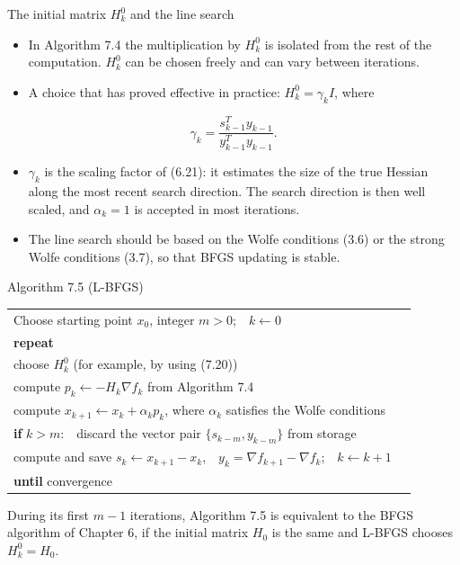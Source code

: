 \documentclass[aspectratio=169,12pt]{beamer}
\makeatletter
\newcommand{\gradf}{\nabla f}
\newcommand{\la}{\leftarrow}
\newcommand{\algostretch}{1.12}
\newenvironment{algo}{\par\renewcommand{\arraystretch}{\algostretch}%
  \begin{tabular}{@{}l@{\hspace{2.2em}}l@{}}}{\end{tabular}\par}
\makeatother
\begin{document}
\begin{frame}{The initial matrix $H_{k}^{0}$ and the line search}
  \begin{itemize}\setlength\itemsep{0.5em}
    \item In Algorithm 7.4 the multiplication by $H_{k}^{0}$ is isolated from the rest of the
      computation. $H_{k}^{0}$ can be chosen freely and can vary between iterations.
    \item A choice that has proved effective in practice: $H_{k}^{0}=\gamma_{k}I$, where
  \end{itemize}
  \[ \gamma_{k}=\frac{s_{k-1}^{T}y_{k-1}}{y_{k-1}^{T}y_{k-1}} . \tag{7.20} \]
  \begin{itemize}\setlength\itemsep{0.5em}
    \item $\gamma_{k}$ is the scaling factor of (6.21): it estimates the size of the true Hessian
      along the most recent search direction. The search direction is then well scaled,
      and $\alpha_{k}=1$ is accepted in most iterations.
    \item The line search should be based on the Wolfe conditions (3.6) or the strong
      Wolfe conditions (3.7), so that BFGS updating is stable.
  \end{itemize}
\end{frame}

\begin{frame}{Algorithm 7.5 (L-BFGS)}
  \begin{block}{}
    \begin{algo}
      Choose starting point $x_{0}$, integer $m>0$;\ \ $k\la 0$ & \\
      \textbf{repeat} & \\
      \qquad choose $H_{k}^{0}$ (for example, by using (7.20)) & \\
      \qquad compute $p_{k}\la-H_{k}\gradf_{k}$ from Algorithm 7.4 & \\
      \qquad compute $x_{k+1}\la x_{k}+\alpha_{k}p_{k}$, where $\alpha_{k}$ satisfies the Wolfe conditions & \\
      \qquad \textbf{if} $k>m$:\ \ discard the vector pair $\{s_{k-m},y_{k-m}\}$ from storage & \\
      \qquad compute and save $s_{k}\la x_{k+1}-x_{k}$,\ \ $y_{k}=\gradf_{k+1}-\gradf_{k}$;\ \ $k\la k+1$ & \\
      \textbf{until} convergence & \\
    \end{algo}
  \end{block}

  During its first $m-1$ iterations, Algorithm 7.5 is equivalent to the BFGS algorithm of
  Chapter 6, if the initial matrix $H_{0}$ is the same and L-BFGS chooses $H_{k}^{0}=H_{0}$.
\end{frame}
\end{document}
